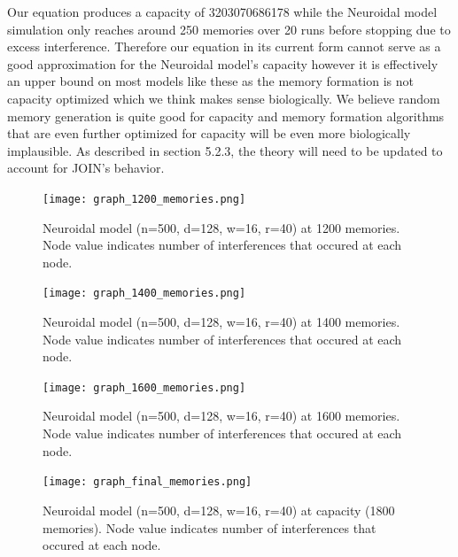 Our equation produces a capacity of 3203070686178 while the Neuroidal model simulation only reaches around 250 memories over 20 runs before stopping due to excess interference. Therefore our equation in its current form cannot serve as a good approximation for the Neuroidal model's capacity however it is effectively an upper bound on most models like these as the memory formation is not capacity optimized which we think makes sense biologically. We believe random memory generation is quite good for capacity and memory formation algorithms that are even further optimized for capacity will be even more biologically implausible. As described in section 5.2.3, the theory will need to be updated to account for JOIN's behavior. 

    \begin{figure}%
        \centering
        \texttt{[image: graph\_1200\_memories.png]}
        \caption[Interference accumulation per node of Neuroidal model at 1200 memories]{Neuroidal model (n=500, d=128, w=16, r=40) at 1200 memories. Node value indicates number of interferences that occured at each node.}
        \label{fig:sub1}
    \end{figure}

    \begin{figure}%
        \centering
        \texttt{[image: graph\_1400\_memories.png]}
        \caption[Interference accumulation per node of Neuroidal model at 1400 memories]{Neuroidal model (n=500, d=128, w=16, r=40) at 1400 memories. Node value indicates number of interferences that occured at each node.}
        \label{fig:sub2}
    \end{figure}

    \begin{figure}%
        \centering
        \texttt{[image: graph\_1600\_memories.png]}
        \caption[Interference accumulation per node of Neuroidal model at 1600 memories]{Neuroidal model (n=500, d=128, w=16, r=40) at 1600 memories. Node value indicates number of interferences that occured at each node.}
        \label{fig:sub3}
    \end{figure}
    
    \begin{figure}%
        \centering
        \texttt{[image: graph\_final\_memories.png]}
        \caption[Interference accumulation per node of Neuroidal model at capacity]{Neuroidal model (n=500, d=128, w=16, r=40) at capacity (1800 memories). Node value indicates number of interferences that occured at each node.}
        \label{fig:sub4}
    \end{figure}

